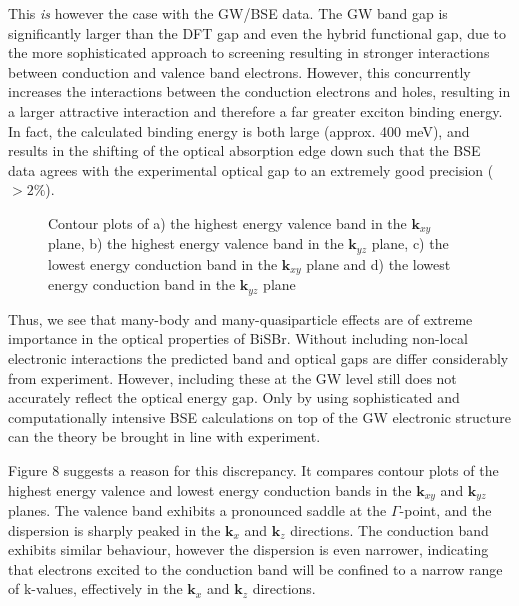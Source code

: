 \documentclass[prb,showpacs,superscriptaddress,titlepage,amsmath,amssymb,twocolumn]{revtex4-1}
\begin{document}
This \textit{is} however the case with the GW/BSE data. The GW band gap is significantly larger than the DFT gap and even the hybrid functional gap, due to the more sophisticated approach to screening resulting in stronger interactions between conduction and valence band electrons. However, this concurrently increases the interactions between the conduction electrons and holes, resulting in a larger attractive interaction and therefore a far greater exciton binding energy. In fact, the calculated binding energy is both large (approx. 400 meV), and results in the shifting of the optical absorption edge down such that the BSE data agrees with the experimental optical gap to an extremely good precision ($> 2 \%$).


\begin{figure}[!t]
    \centering
    \caption{Contour plots of a) the highest energy valence band in the $\mathbf{k}_{xy}$ plane, b) the highest energy valence band in the $\mathbf{k}_{yz}$ plane, c) the lowest energy conduction band in the $\mathbf{k}_{xy}$ plane and d) the lowest energy conduction band in the $\mathbf{k}_{yz}$ plane}
    \label{fig:bs}
\end{figure}

Thus, we see that many-body and many-quasiparticle effects are of extreme importance in the optical properties of BiSBr. Without including non-local electronic interactions the predicted band and optical gaps are differ considerably from experiment. However, including these at the GW level still does not accurately reflect the optical energy gap. Only by using sophisticated and computationally intensive BSE calculations on top of the GW electronic structure can the theory be brought in line with experiment.

Figure 8 suggests a reason for this discrepancy. It compares contour plots of the highest energy valence and lowest energy conduction bands in the $\mathbf{k}_{xy}$ and $\mathbf{k}_{yz}$ planes. The valence band exhibits a pronounced saddle at the $\Gamma$-point, and the dispersion is sharply peaked in the $\mathbf{k}_{x}$ and $\mathbf{k}_{z}$ directions. The conduction band exhibits similar behaviour, however the dispersion is even narrower, indicating that electrons excited to the conduction band will be confined to a narrow range of k-values, effectively in the $\mathbf{k}_{x}$ and $\mathbf{k}_{z}$ directions.
\end{document}
